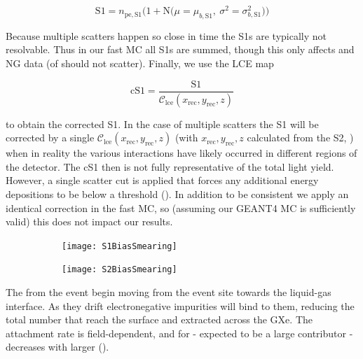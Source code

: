 \begin{equation}
\mathrm{S1} = n_{\mathrm{pe,S1}} \Big( 1 + \mathrm{N} \big( \mu = \mu_{b, \mathrm{S1}},\ \sigma^2 = \sigma_{b, \mathrm{S1}}^2 \big)
\Big)
\label{eq:er_nr_calibrations_parameter_determ_det_phys_s1_bias_smear}
\end{equation}

Because multiple scatters happen so close in time the S1s are typically not resolvable.  Thus in our fast MC all S1s are summed, though
this only affects \ambe and NG data (\betadecay of  should not scatter).  Finally, we use the LCE map

\begin{equation}
\mathrm{cS1} = \frac{\mathrm{S1}}{\mathcal{C}_{\mathrm{lce}}(x_{\mathrm{rec}}, y_{\mathrm{rec}}, z)}
\label{eq:er_nr_calibrations_parameter_determ_det_phys_cs1}
\end{equation}

\noindent to obtain the corrected S1.  In the case of multiple scatters the S1 will be corrected by a single
$\mathcal{C}_{\mathrm{lce}}(x_{\mathrm{rec}}, y_{\mathrm{rec}}, z)$ (with $x_{\mathrm{rec}}, y_{\mathrm{rec}}, z$ calculated from the S2,
) when in reality the various interactions have
likely occurred in different regions of the detector.  The cS1 then is not fully representative of the total light yield.  However,
a single scatter cut is applied that forces any additional energy depositions to be below a threshold
().  In addition to be
consistent we apply an identical correction in the fast MC, so (assuming our GEANT4 MC is sufficiently valid) this does not impact our
results.

\begin{figure}
    \centering
    \begin{subfigure}[t]{0.45\textwidth}
        \centering
        \texttt{[image: S1BiasSmearing]}
    \end{subfigure}%
    \begin{subfigure}[t]{0.45\textwidth}
        \centering
        \texttt{[image: S2BiasSmearing]}
    \end{subfigure}
    \caption{}
	\label{fig:er_nr_calibrations_parameter_determ_det_phys_bias_smear}
\end{figure}

The \electron from the event begin moving from the event site towards the liquid-gas interface.  As they drift electronegative
impurities will bind to them, reducing the total number that reach the surface and extracted across the GXe.  The attachment rate
is field-dependent, and for  - expected to be a large contributor - decreases with larger \ed
().

